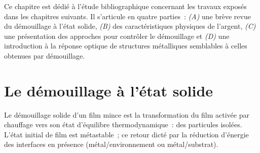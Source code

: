 \minitoc
\newpage

Ce chapitre est dédié à l'étude bibliographique concernant les travaux exposés dans les chapitres suivants. Il s'articule en quatre parties~: \textit{(A)} une brève revue du démouillage à l'état solide, \textit{(B)} des caractéristiques physiques de l'argent, \textit{(C)} une présentation des approches pour contrôler le démouillage et \textit{(D)} une introduction à la réponse optique de structures métalliques semblables à celles obtenues par démouillage.


\section{Le démouillage à l'état solide}
Le démouillage solide d'un film mince est la transformation du film activée par chauffage vers son état d'équilibre thermodynamique~: des particules isolées. L'état initial de film est métastable~; ce retour dicté par la réduction d'énergie des interfaces en présence (métal/environnement ou métal/substrat).\par 
